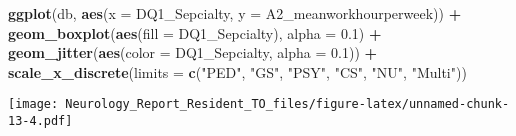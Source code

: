 \documentclass[]{book}
\newenvironment{Shaded}{\begin{snugshade}}{\end{snugshade}}
\newcommand{\DataTypeTok}[1]{\textcolor[rgb]{0.13,0.29,0.53}{#1}}
\newcommand{\FloatTok}[1]{\textcolor[rgb]{0.00,0.00,0.81}{#1}}
\newcommand{\KeywordTok}[1]{\textcolor[rgb]{0.13,0.29,0.53}{\textbf{#1}}}
\newcommand{\NormalTok}[1]{#1}
\newcommand{\OperatorTok}[1]{\textcolor[rgb]{0.81,0.36,0.00}{\textbf{#1}}}
\newcommand{\StringTok}[1]{\textcolor[rgb]{0.31,0.60,0.02}{#1}}
\begin{document}
\begin{Shaded}
\begin{Highlighting}[]
\KeywordTok{ggplot}\NormalTok{(db, }\KeywordTok{aes}\NormalTok{(}\DataTypeTok{x =}\NormalTok{ DQ1_Sepcialty, }\DataTypeTok{y =}\NormalTok{ A2_meanworkhourperweek)) }\OperatorTok{+}
\StringTok{  }\KeywordTok{geom_boxplot}\NormalTok{(}\KeywordTok{aes}\NormalTok{(}\DataTypeTok{fill =}\NormalTok{ DQ1_Sepcialty), }\DataTypeTok{alpha =} \FloatTok{0.1}\NormalTok{) }\OperatorTok{+}\StringTok{ }
\StringTok{  }\KeywordTok{geom_jitter}\NormalTok{(}\KeywordTok{aes}\NormalTok{(}\DataTypeTok{color =}\NormalTok{ DQ1_Sepcialty, }\DataTypeTok{alpha =} \FloatTok{0.1}\NormalTok{)) }\OperatorTok{+}
\StringTok{  }\KeywordTok{scale_x_discrete}\NormalTok{(}\DataTypeTok{limits =} \KeywordTok{c}\NormalTok{(}\StringTok{"PED"}\NormalTok{, }\StringTok{"GS"}\NormalTok{, }\StringTok{"PSY"}\NormalTok{, }\StringTok{"CS"}\NormalTok{, }\StringTok{"NU"}\NormalTok{, }\StringTok{"Multi"}\NormalTok{))}
\end{Highlighting}
\end{Shaded}

\texttt{[image: Neurology\_Report\_Resident\_TO\_files/figure-latex/unnamed-chunk-13-4.pdf]}


\end{document}
